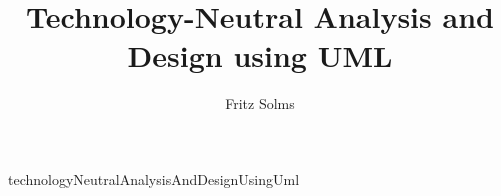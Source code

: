 \documentclass[a4paper]{article}
\title{Technology-Neutral Analysis and Design using UML}
\author{Fritz Solms}
\begin{document}
  \maketitle
  \tableofcontents
  
  {technologyNeutralAnalysisAndDesignUsingUml}
\end{document}
